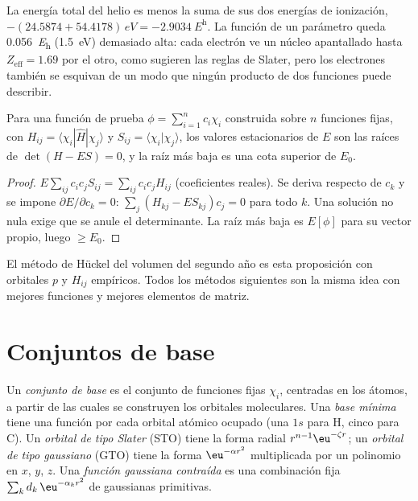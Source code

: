 \begin{example}\label{ex:b3:computational-chemistry:helium}
La energía total del helio es menos la suma de sus dos energías de ionización,
$-(24.5874 + 54.4178)\,\unit{eV} = \qty{-2.9034}{\hartree}$. La función de un
parámetro queda \qty{0.056}{\hartree} (\qty{1.5}{eV}) demasiado alta: cada electrón ve un
núcleo apantallado hasta $Z_{\mathrm{eff}} = 1.69$ por el otro, como sugieren
las reglas de Slater, pero los electrones también se esquivan de un modo que ningún producto de dos
funciones puede describir.
\end{example}

\begin{proposition}\label{prop:b3:computational-chemistry:linear-variation}
Para una función de prueba $\phi = \sum_{i=1}^n c_i\chi_i$ construida sobre $n$ funciones fijas,
con $H_{ij} = \langle\chi_i|\hat H|\chi_j\rangle$ y $S_{ij} = \langle\chi_i|\chi_j
\rangle$, los valores estacionarios de $E$ son las raíces de $\det(H - ES) = 0$, y
la raíz más baja es una cota superior de $E_0$.
\end{proposition}

\begin{proof}
$E\sum_{ij}c_ic_jS_{ij} = \sum_{ij}c_ic_jH_{ij}$ (coeficientes reales). Se deriva
respecto de $c_k$ y se impone $\partial E/\partial c_k = 0$: $\sum_j(H_{kj} -
ES_{kj})c_j = 0$ para todo $k$. Una solución no nula exige que se anule el
determinante. La raíz más baja es $E[\phi]$ para su vector propio, luego $\ge E_0$.
\end{proof}

El método de Hückel del volumen del segundo año es esta proposición con orbitales
$p$ y $H_{ij}$ empíricos. Todos los métodos siguientes son la misma idea con
mejores funciones y mejores elementos de matriz.

\section{Conjuntos de base}

\begin{definition}\label{def:b3:computational-chemistry:basis}
Un \emph{conjunto de base} es el conjunto de funciones fijas $\chi_i$,
centradas en los átomos, a partir de las cuales se construyen los orbitales moleculares. Una
\emph{base mínima} tiene una función por cada
orbital atómico ocupado (una $1s$ para H, cinco para C). Un \emph{orbital de tipo
Slater} (STO) tiene la forma radial
$r^{n-1}\eu^{-\zeta r}$; un \emph{orbital de tipo gaussiano}
(GTO) tiene la forma $\eu^{-\alpha r^2}$ multiplicada por un polinomio en $x$, $y$,
$z$. Una \emph{función gaussiana contraída}
es una combinación fija $\sum_kd_k\,\eu^{-\alpha_kr^2}$ de gaussianas primitivas.
\end{definition}

